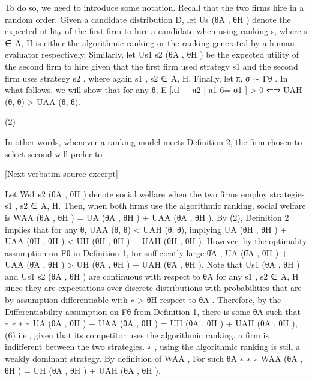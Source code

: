 \documentclass[10pt]{article}
\begin{document}
\begin{ReviewVerbatim}
To do so, we need to introduce some notation. Recall that the two firms hire in a random order. Given
a candidate distribution D, let Us (θA , θH ) denote the expected utility of the first firm to hire a candidate
when using ranking s, where s ∈ {A, H} is either the algorithmic ranking or the ranking generated by a
human evaluator respectively. Similarly, let Us1 s2 (θA , θH ) be the expected utility of the second firm to hire
given that the first firm used strategy s1 and the second firm uses strategy s2 , where again s1 , s2 ∈ {A, H}.
Finally, let π, σ ∼ Fθ .
In what follows, we will show that for any θ,
E [π1 − π2 | π1 6= σ1 ] > 0 ⇐⇒ UAH (θ, θ) > UAA (θ, θ).

(2)

In other words, whenever a ranking model meets Definition 2, the firm chosen to select second will prefer to

[Next verbatim source excerpt]

Let Ws1 s2 (θA , θH ) denote social welfare when the two firms employ strategies s1 , s2 ∈ {A, H}. Then,
when both firms use the algorithmic ranking, social welfare is
WAA (θA , θH ) = UA (θA , θH ) + UAA (θA , θH ).
By (2), Definition 2 implies that for any θ, UAA (θ, θ) < UAH (θ, θ), implying
UA (θH , θH ) + UAA (θH , θH ) < UH (θH , θH ) + UAH (θH , θH ).
However, by the optimality assumption on Fθ in Definition 1, for sufficiently large θ̂A ,
UA (θ̂A , θH ) + UAA (θ̂A , θH ) > UH (θ̂A , θH ) + UAH (θ̂A , θH ).
Note that Us1 (θA , θH ) and Us1 s2 (θA , θH ) are continuous with respect to θA for any s1 , s2 ∈ {A, H} since
they are expectations over discrete distributions with probabilities that are by assumption differentiable with
∗
> θH
respect to θA . Therefore, by the Differentiability assumption on Fθ from Definition 1, there is some θA
such that
∗
∗
∗
∗
UA (θA
, θH ) + UAA (θA
, θH ) = UH (θA
, θH ) + UAH (θA
, θH ),
(6)
i.e., given that its competitor uses the algorithmic ranking, a firm is indifferent between the two strategies.
∗
, using the algorithmic ranking is still a weakly dominant strategy. By definition of WAA ,
For such θA
∗
∗
∗
WAA (θA
, θH ) = UH (θA
, θH ) + UAH (θA
, θH ).
\end{ReviewVerbatim}
\end{document}
